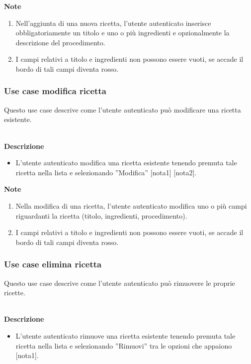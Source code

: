 \documentclass[a4paper,12pt]{article}
\begin{document}
\textbf{Note}
\begin{enumerate} \setlength\itemsep{0.01em}
\item Nell'aggiunta di una nuova ricetta, l'utente autenticato inserisce obbligatoriamente un titolo e uno o più ingredienti e opzionalmente la descrizione del procedimento.
\item I campi relativi a titolo e ingredienti non possono essere vuoti, se accade il bordo di tali campi diventa rosso.
\end{enumerate}



\subsubsection*{Use case modifica ricetta}

Questo use case descrive come l'utente autenticato può modificare una ricetta esistente.

\textbf{\\Descrizione}
\begin{itemize} \setlength\itemsep{0.01em}
\item L'utente autenticato modifica una ricetta esistente tenendo premuta tale ricetta nella lista e selezionando ''Modifica'' [nota1] [nota2].
\end{itemize}

\textbf{Note}
\begin{enumerate} \setlength\itemsep{0.01em}
\item Nella modifica di una ricetta, l'utente autenticato modifica uno o più campi riguardanti la ricetta (titolo, ingredienti, procedimento).
\item I campi relativi a titolo e ingredienti non possono essere vuoti, se accade il bordo di tali campi diventa rosso.
\end{enumerate}



\subsubsection*{Use case elimina ricetta}

Questo use case descrive come l'utente autenticato può rimuovere le proprie ricette.

\textbf{\\Descrizione}
\begin{itemize} \setlength\itemsep{0.01em}
\item L'utente autenticato rimuove una ricetta esistente tenendo premuta tale ricetta nella lista e selezionando ''Rimuovi'' tra le opzioni che appaiono [nota1].
\end{itemize}
\end{document}
